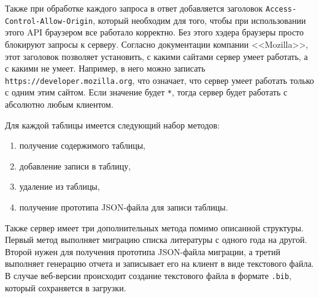 Также при обработке каждого запроса в ответ добавляется заголовок \texttt{Access-Control-Allow-Origin}, который необходим
для того, чтобы при использовании этого API браузером все работало корректно. Без этого хэдера браузеры просто блокируют запросы
к серверу. Согласно документации компании <<Mozilla>>\cite{Access-Control-Allow-Origin}, этот заголовок позволяет
установить, с какими сайтами сервер умеет работать, а с какими не умеет. Например, в него можно записать \texttt{https://developer.mozilla.org},
что означает, что сервер умеет работать только с одним этим сайтом. Если значение будет \texttt{*}, тогда сервер будет работать с абсолютно
любым клиентом.

Для каждой таблицы имеется следующий набор методов:

\begin{enumerate}
	\item получение содержимого таблицы,
	\item добавление записи в таблицу,
	\item удаление из таблицы,
	\item получение прототипа JSON-файла для записи таблицы.
\end{enumerate}

Также сервер имеет три дополнительных метода помимо описанной структуры. 
Первый метод выполняет миграцию списка литературы с одного года на другой.
Второй нужен для получения прототипа JSON-файла миграции, а третий выполняет генерацию отчета
и записывает его на клиент в виде текстового файла. В случае веб-версии происходит создание текстового файла в формате \texttt{.bib}, который
сохраняется в загрузки.